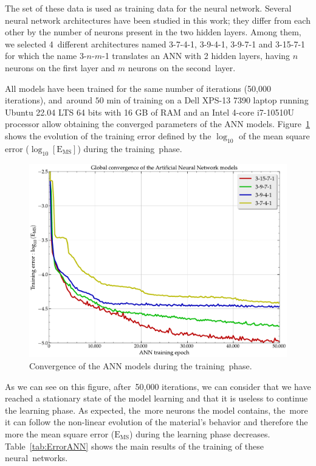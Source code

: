 \documentclass[algorithms,article,accept,pdftex,oneauthors]{Definitions/mdpi}
\DeclareRobustCommand{\MSE}{\text{E}_\text{MS}}
\begin{document}
The set of these data is used as training data for the neural network.
Several neural network architectures have been studied in this work; they differ from each other by the number of neurons present in the two hidden layers.
Among them, we selected 4~different architectures named 3-7-4-1, 3-9-4-1, 3-9-7-1 and 3-15-7-1 for which the name 3-$n$-$m$-1 translates an ANN with 2 hidden layers, having $n$ neurons on the first layer and $m$ neurons on the second~layer.

All models have been trained for the same number of iterations (50,000 iterations), and~around $50$ min of training on a Dell XPS-13 7390 laptop running Ubuntu 22.04 LTS 64 bits with 16 GB of RAM and an Intel 4-core i7-10510U processor allow obtaining the converged parameters of the ANN models.
Figure~\ref{fig:Convergence-ANN} shows the evolution of the training error defined by the $\log_{10}$ of the mean square error ($\log_{10}\left[\MSE\right]$) during the training~phase.
\begin{figure}[H]
\includegraphics[width=0.65\columnwidth]{Figures/Convergence-ANN}
\caption{{Convergence} %
 of the ANN models during the training~phase.}
\label{fig:Convergence-ANN}
\end{figure}
As we can see on this figure, after~50,000 iterations, we can consider that we have reached a stationary state of the model learning and that it is useless to continue the learning phase.
As expected, the~more neurons the model contains, the~more it can follow the non-linear evolution of the material’s behavior and therefore the more the mean square error ($\MSE$) during the learning phase decreases.
Table~\ref{tab:ErrorANN} shows the main results of the training of these neural~networks.
\end{document}
